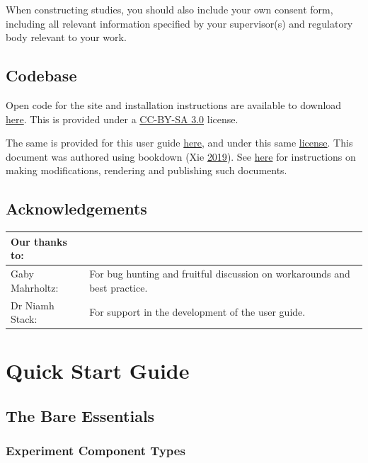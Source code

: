 \documentclass[]{book}
\begin{document}
When constructing studies, you should also include your own consent
form, including all relevant information specified by your supervisor(s)
and regulatory body relevant to your work.

\section*{Codebase}\label{codebase}

Open code for the site and installation instructions are available to
download \href{https://github.com/debruine/experimentum}{here}. This is
provided under a
\href{https://creativecommons.org/licenses/by-sa/3.0/legalcode}{CC-BY-SA
3.0} license.

The same is provided for this user guide
\href{https://github.com/RebeccaJLai/exp_manual}{here}, and under this
same
\href{https://creativecommons.org/licenses/by-sa/3.0/legalcode}{license}.
This document was authored using bookdown (Xie
\protect\hyperlink{ref-R-bookdown}{2019}). See
\href{https://bookdown.org/yihui/bookdown/}{here} for instructions on
making modifications, rendering and publishing such documents.

\section*{Acknowledgements}\label{acknowledgements}

\begin{tabular}{l|l}
\hline
Our thanks to: &  \\
\hline
Gaby Mahrholtz: & For bug hunting and fruitful discussion on workarounds and best practice.\\
\hline
Dr Niamh Stack: & For support in the development of the user guide.\\
\hline
\end{tabular}

\chapter{Quick Start Guide}\label{quick-start-guide}

\section{The Bare Essentials}\label{the-bare-essentials}

\subsection{Experiment Component
Types}\label{experiment-component-types}
\end{document}
